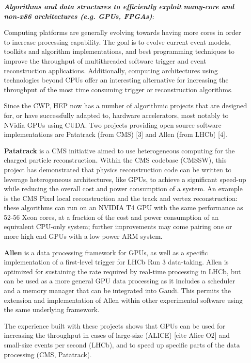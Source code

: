 \documentclass[11pt,a4paper]{article}
\begin{document}
\emph{\textbf{Algorithms and data structures to efficiently exploit}}
\emph{\textbf{many-core and non-x86 architectures (e.g. GPUs, FPGAs)}:}

Computing platforms are generally evolving towards having more cores in
order to increase processing capability. The goal is to evolve current
event models, toolkits and algorithm implementations, and best
programming techniques to improve the throughput of multithreaded
software trigger and event reconstruction applications. Additionally,
computing architectures using technologies beyond CPUs offer an
interesting alternative for increasing the throughput of the most time
consuming trigger or reconstruction algorithms.

Since the CWP, HEP now has a number of algorithmic projects that are
designed for, or have successfully adapted to, hardware accelerators,
most notably to NVidia GPUs using CUDA. Two projects providing open
source software implementations are Patatrack (from CMS) {[}3{]} and
Allen (from LHCb) {[}4{]}.

\textbf{Patatrack} is a CMS initiative aimed to use heterogeneous
computing for the charged particle reconstruction. Within the CMS
codebase (CMSSW), this project has demonstrated that physics
reconstruction code can be written to leverage heterogeneous
architectures, like GPUs, to achieve a significant speed-up while
reducing the overall cost and power consumption of a system. An example
is the CMS Pixel local reconstruction and the track and vertex
reconstruction: these algorithms can run on an NVIDIA T4 GPU with the
same performance as 52-56 Xeon cores, at a fraction of the cost and
power consumption of an equivalent CPU-only system; further improvements
may come pairing one or more high end GPUs with a low power ARM system.

\textbf{Allen} is a data processing framework for GPUs, as well as a
specific implementation of a first-level trigger for LHCb Run 3
data-taking. Allen is optimized for sustaining the rate required by
real-time processing in LHCb, but can be used as a more general GPU data
processing as it includes a scheduler and a memory manager that can be
integrated into Gaudi. This permits the extension and implementation of
Allen within other experimental software using the same underlying
framework.

The experience built with these projects shows that GPUs can be used for
increasing the throughput in cases of large-size (ALICE) {[}cite Alice
O2{]} and small-size events per second (LHCb), and to speed up specific
parts of the data processing (CMS, Patatrack).
\end{document}
